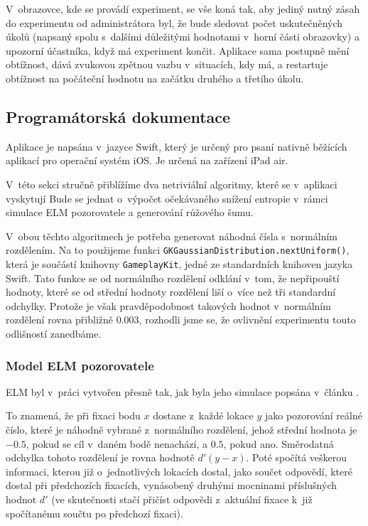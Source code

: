 \bigskip
V~obrazovce, kde se provádí experiment, se vše koná tak, aby jediný nutný zásah
do experimentu od administrátora byl, že bude sledovat počet uskutečněných
úkolů (napsaný spolu s~dalšími důležitými hodnotami v~horní části obrazovky) a
upozorní účastníka, když má experiment končit. Aplikace sama postupně mění
obtížnost, dává zvukovou zpětnou vazbu v~situacích, kdy má, a restartuje
obtížnost na počáteční hodnotu na začátku druhého a třetího úkolu.

\subsection*{Programátorská dokumentace}

Aplikace je napsána v~jazyce Swift, který je určený pro psaní nativně běžících
aplikací pro operační systém iOS. Je určená na zařízení iPad air.

V~této sekci stručně přiblížíme dva netriviální algoritmy, které se v~aplikaci
vyskytují Bude se jednat o~výpočet očekávaného snížení entropie v~rámci
simulace ELM pozorovatele a generování růžového šumu.

V~obou těchto algoritmech je potřeba generovat náhodná čísla s~normálním
rozdělením. Na to použijeme funkci {\tt GKGaussianDistribution.nextUniform()},
která je součástí knihovny {\tt GameplayKit}, jedné ze standardních knihoven
jazyka Swift. Tato funkce se od normálního rozdělení odklání v~tom, že
nepřipouští hodnoty, které se od střední hodnoty rozdělení liší o~více než tři
standardní odchylky. Protože je však pravděpodobnost takových hodnot
v~normálním rozdělení rovna přibližně $0.003$, rozhodli jsme se, že ovlivnění
experimentu touto odlišností zanedbáme.

\subsubsection*{Model ELM pozorovatele}

ELM  byl v~práci vytvořen přesně tak, jak byla jeho simulace popsána v~článku \citep{Najemnik09}. 

To znamená, že při fixaci bodu $x$  dostane z~každé lokace $y$ jako pozorování reálné
číslo, které je náhodně vybrané z~normálního rozdělení, jehož střední hodnota
je $-0.5$, pokud se cíl v~daném bodě nenachází, a $0.5$, pokud ano. Směrodatná
odchylka tohoto rozdělení je rovna hodnotě $d'(y-x)$. Poté
spočítá veškerou informaci, kterou již o~jednotlivých lokacích dostal, jako
součet odpovědí, které dostal při předchozích fixacích, vynásobený druhými
mocninami příslušných hodnot $d'$ (ve skutečnosti stačí přičíst odpovědi
z~aktuální fixace k~již spočítanému součtu po předchozí fixaci).

